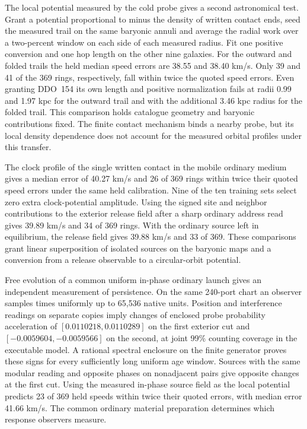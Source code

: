 \documentclass[11pt]{article}
\begin{document}
The local potential measured by the cold probe gives a second astronomical
test. Grant a potential proportional to minus the density of written
contact ends, seed the measured trail on the same baryonic annuli and
average the radial work over a two-percent window on each side of each
measured radius. Fit one positive conversion and one hop length on the
other nine galaxies. For the outward and folded trails the held median
speed errors are 38.55 and 38.40 km/s. Only 39 and 41 of the 369 rings,
respectively, fall within twice the quoted speed errors. Even granting
DDO~154 its own length and positive normalization fails at radii 0.99
and 1.97 kpc for the outward trail and with the additional 3.46 kpc
radius for the folded trail. This comparison holds catalogue geometry
and baryonic contributions fixed. The finite contact mechanism binds a
nearby probe, but its local density dependence does not account for
the measured orbital profiles under this transfer.

The clock profile of the single written contact in the mobile ordinary
medium gives a median error of 40.27 km/s and 26 of 369 rings within
twice their quoted speed errors under the same held calibration. Nine
of the ten training sets select zero extra clock-potential amplitude.
Using the signed site and neighbor contributions to the exterior
release field after a sharp ordinary address read gives 39.89 km/s and
34 of 369 rings. With the ordinary source left in equilibrium, the
release field gives 39.88 km/s and 33 of 369. These comparisons grant
linear superposition of
isolated sources on the baryonic maps and a conversion from a release
observable to a circular-orbit potential.

Free evolution of a common uniform in-phase ordinary launch gives an
independent measurement of persistence. On the same 240-port chart an
observer samples times uniformly up to 65,536 native units. Position and
interference readings on separate copies imply changes of enclosed probe
probability acceleration of $[0.0110218,0.0110289]$ on the first exterior
cut and $[-0.0059604,-0.0059566]$ on the second, at joint 99\% counting
coverage in the executable model. A rational spectral enclosure on the
finite generator proves these signs for every sufficiently long uniform
age window. Sources with the same modular reading and opposite phases
on nonadjacent pairs give opposite changes at the first cut. Using the
measured in-phase source field as the local potential predicts 23 of 369
held speeds within twice their quoted errors, with median error
41.66 km/s. The common ordinary material preparation determines which
response observers measure.
\end{document}
